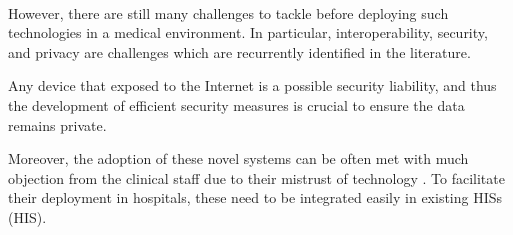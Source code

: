 \paragraph{} However, there are still many challenges to tackle before deploying such technologies in a medical environment. In particular, interoperability, security, and privacy are challenges which are recurrently identified in the literature. 

Any device that exposed to the Internet is a possible security liability, and thus the development of efficient security measures is crucial to ensure the data remains private. 

Moreover, the adoption of these novel systems can be often met with much objection from the clinical staff due to their mistrust of technology \cite{DursunErgezen2020}. To facilitate their deployment in hospitals, these need to be integrated easily in existing \acl{HIS}s (\acs{HIS}).





